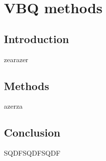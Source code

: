 %


\chapter{VBQ methods}
\label{chap:VBQ_meth}
\minitoc

\section{Introduction}

zearazer

\section{Methods}

azerza

\section{Conclusion}

SQDFSQDFSQDF